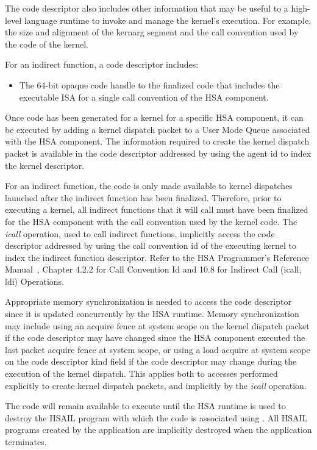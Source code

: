 \documentclass[final]{book}
\begin{document}
The code descriptor also includes other information that may be useful to a high-level
language runtime to invoke and manage the kernel's execution. For example, the size
and alignment of the kernarg segment and the call convention used by the code of the
kernel.

For an indirect function, a code descriptor includes:
\begin{itemize}
\item{The 64-bit opaque code handle to the finalized code that includes the executable
ISA for a single call convention of the HSA component.}
\end{itemize}

Once code has been generated for a kernel for a specific HSA component, it can be
executed by adding a kernel dispatch packet to a User Mode Queue associated with
the HSA component. The information required to create the kernel dispatch packet is
available in the code descriptor addressed by using the agent id to index the kernel
descriptor.

For an indirect function, the code is only made available to kernel dispatches launched
after the indirect function has been finalized. Therefore, prior to executing a kernel,
all indirect functions that it will call must have been finalized for the HSA component
with the call convention used by the kernel code. The \emph{icall} operation, used to call
indirect functions, implicitly access the code descriptor addressed by using the call
convention id of the executing kernel to index the indirect function descriptor. Refer to
the HSA Programmer's Reference Manual~\cite{prm}, Chapter 4.2.2 for Call Convention Id and 10.8 for
Indirect Call (icall, ldi) Operations.

Appropriate memory synchronization is needed to access the code descriptor since
it is updated concurrently by the HSA runtime. Memory synchronization may include
using an acquire fence at system scope on the kernel dispatch packet if the code
descriptor may have changed since the HSA component executed the last packet
acquire fence at system scope, or using a load acquire at system scope on the code
descriptor kind field if the code descriptor may change during the execution of the
kernel dispatch. This applies both to accesses performed explicitly to create kernel
dispatch packets, and implicitly by the \emph{icall} operation.

The code will remain available to execute until the HSA runtime is used to destroy the
HSAIL program with which the code is associated using . All
HSAIL programs created by the application are implicitly destroyed when the application terminates.
\end{document}
